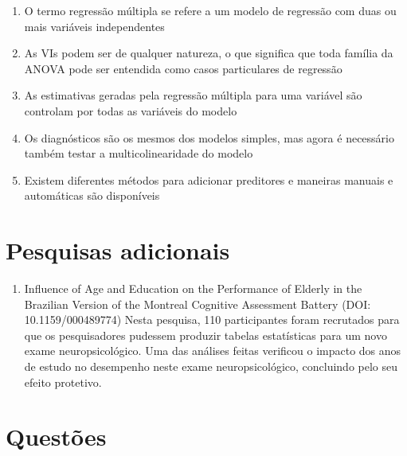 \documentclass[
]{book}
\providecommand{\tightlist}{%
  \setlength{\itemsep}{0pt}\setlength{\parskip}{0pt}}
\begin{document}
\begin{explore}

\begin{enumerate}
\def\labelenumi{\arabic{enumi}.}
\tightlist
\item
  O termo regressão múltipla se refere a um modelo de regressão com duas ou mais variáveis independentes\\
\item
  As VIs podem ser de qualquer natureza, o que significa que toda família da ANOVA pode ser entendida como casos particulares de regressão
\item
  As estimativas geradas pela regressão múltipla para uma variável são controlam por todas as variáveis do modelo\\
\item
  Os diagnósticos são os mesmos dos modelos simples, mas agora é necessário também testar a multicolinearidade do modelo\\
\item
  Existem diferentes métodos para adicionar preditores e maneiras manuais e automáticas são disponíveis\\
\end{enumerate}

\end{explore}

\hypertarget{pesquisas-adicionais-7}{%
\section{Pesquisas adicionais}\label{pesquisas-adicionais-7}}

\begin{enumerate}
\def\labelenumi{\arabic{enumi}.}
\tightlist
\item
  Influence of Age and Education on the Performance of Elderly in the Brazilian Version of the Montreal Cognitive Assessment Battery (DOI: 10.1159/000489774)
  Nesta pesquisa, 110 participantes foram recrutados para que os pesquisadores pudessem produzir tabelas estatísticas para um novo exame neuropsicológico. Uma das análises feitas verificou o impacto dos anos de estudo no desempenho neste exame neuropsicológico, concluindo pelo seu efeito protetivo.
\end{enumerate}

\hypertarget{questuxf5es-5}{%
\section{Questões}\label{questuxf5es-5}}
\end{document}
